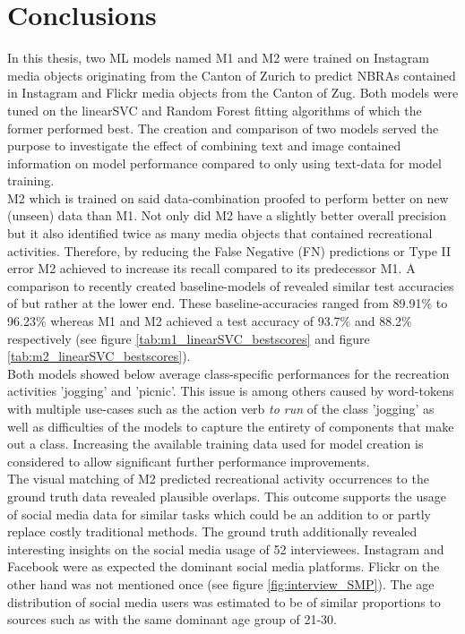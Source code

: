 \chapter{Conclusions} \label{conclusion_outlook}

In this thesis, two ML models named M1 and M2 were trained on Instagram media objects originating from the Canton of Zurich to predict NBRAs contained in Instagram and Flickr media objects from the Canton of Zug. Both models were tuned on the linearSVC and Random Forest fitting algorithms of which the former performed best. The creation and comparison of two models served the purpose to investigate the effect of combining text and image contained information on model performance compared to only using text-data for model training.\\
M2 which is trained on said data-combination proofed to perform better on new (unseen) data than M1. Not only did M2 have a slightly better overall precision but it also identified twice as many media objects that contained recreational activities. Therefore, by reducing the False Negative (FN) predictions or Type II error M2 achieved to increase its recall compared to its predecessor M1. A comparison to recently created baseline-models of \parencite{Das2018, Li2018} revealed similar test accuracies of but rather at the lower end. These baseline-accuracies ranged from 89.91\% to 96.23\% whereas M1 and M2 achieved a test accuracy of 93.7\% and 88.2\% respectively (see figure \ref{tab:m1_linearSVC_bestscores} and figure \ref{tab:m2_linearSVC_bestscores}). \\

Both models showed below average class-specific performances for the recreation activities 'jogging' and 'picnic'. This issue is among others caused by word-tokens with multiple use-cases such as the action verb \textit{to run} of the class 'jogging' as well as difficulties of the models to capture the entirety of components that make
out a class. Increasing the available training data used for model creation is considered to allow significant further performance improvements.\\ 

The visual matching of M2 predicted recreational activity occurrences to the ground truth data revealed plausible overlaps. This outcome supports the usage of social media data for similar tasks which could be an addition to or partly replace costly traditional methods. The ground truth additionally revealed interesting insights on the social media usage of 52 interviewees. Instagram and Facebook were as expected the dominant social media platforms. Flickr on the other hand was not mentioned once (see figure \ref{fig:interview_SMP}). The age distribution of social media users was estimated to be of similar proportions to sources such as \parencite{2013} with the same dominant age group of 21-30.

